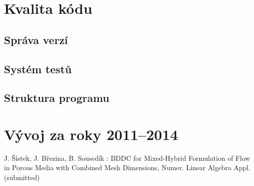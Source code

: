 \documentclass[11pt]{report}
\begin{document}
\section{Kvalita kódu}
\subsection{Správa verzí}
\subsection{Systém testů}
\subsection{Struktura programu}



\section{Vývoj za roky 2011--2014}

\begin{thebibliography}{99}

J. Šístek, J. Březina, B. Sousedík : BDDC for Mixed-Hybrid 
Formulation of Flow in Porous Media with Combined Mesh Dimensions, Numer. Linear 
Algebra Appl. (submitted)
\end{thebibliography}
\end{document}
